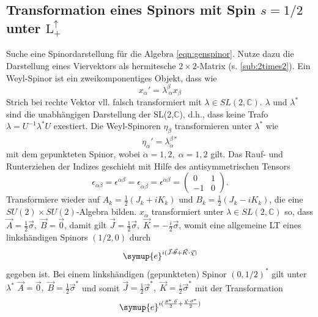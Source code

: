 \documentclass[
  captions=tableheading,  %
  titlepage=firstiscover, %
]{scrartcl}
\begin{document}
\subsection{Transformation eines Spinors mit Spin \texorpdfstring{$s = 1/2$}{PDFstring}
unter \texorpdfstring{$\text{L}_+^{\uparrow}$}{PDFstring}}
Suche eine Spinordarstellung für die Algebra \eqref{eqn:genspinor}.
Nutze dazu die Darstellung eines Viervektors als hermitesche $2\times 2$-Matrix (s. \ref{sub:2times2}).
Ein Weyl-Spinor ist ein zweikomponentiges Objekt, dass wie 
\begin{equation*}
  x_{\alpha}' = \lambda_{\; \alpha}^{\beta} x_{\beta}
\end{equation*}
{\color{red} Strich bei rechte Vektor vll. falsch}
transformiert mit $\lambda \in SL(2, \mathbb{C})$.
$\lambda$ und $\lambda^*$ sind die unabhängigen Darstellung der SL(2,$\mathbb{C}$), d.h., dass 
keine Trafo $\lambda = U^{-1} \lambda^* U$ exestiert.
Die Weyl-Spinoren $\eta_{\dot{\beta}}$ transformieren unter $\lambda^*$ wie 
\begin{equation*}
  \eta_{\dot{\alpha}}' =  \lambda_{\dot{\alpha}}^{\dot{\beta}*} 
\end{equation*}
mit dem gepunkteten Spinor, wobei $\dot{\alpha} = 1,2, \; \alpha  = 1,2$ gilt.
Das Rauf- und Runterziehen der Indizes geschieht mit Hilfe des antisymmetrischen Tensors  
\begin{equation*}
  \epsilon_{\alpha \beta} = \epsilon^{\alpha \beta} = \epsilon_{\dot{\alpha} \dot{\beta}} =
  \epsilon^{\dot{\alpha} \dot{\beta}}  = 
  \begin{pmatrix}
    0 & 1 \\
    -1 & 0
  \end{pmatrix} .
\end{equation*}
Transformiere wieder auf $A_k = \frac{1}{2} (J_k + i K_k)$ und $B_k = \frac{1}{2} (J_k - i K_k)$, die eine 
$SU(2) \times SU(2)$-Algebra bilden.
$x_{\alpha}$ transformiert unter $\lambda \in SL(2, \mathbb{C})$ so, dass 
$\vec{A} = \frac{1}{2}\vec{\sigma}, \; \vec{B} = \vec{0}$, damit gilt 
$\vec{J} =\frac{1}{2}\vec{\sigma}, \; \vec{K} = -\frac{i}{2}\vec{\sigma}$, womit eine 
allgemeine LT eines linkshändigen Spinors $(1/2, 0)$ durch 
\begin{equation*}
  \symup{e}^{i(\vec{J}\cdot \vec{\theta} + \vec{K} \cdot \vec{\chi})}
\end{equation*}
gegeben ist.
Bei einem linkshändigen (gepunkteten) Spinor $(0, 1/2)^*$ gilt unter $\lambda^*$ 
$\vec{A} = \vec{0}, \; \vec{B} = \frac{1}{2}\vec{\sigma}^*$ und somit 
$\vec{J} =\frac{1}{2}\vec{\sigma}^*, \; \vec{K} = \frac{i}{2}\vec{\sigma}^*$ 
mit der Transformation 
\begin{equation*}
  \symup{e}^{i(\frac{\vec{\sigma}^* \cdot \vec{\theta}}{2} + \frac{\vec{\chi} \cdot \vec{\sigma}^*}{2})}
\end{equation*}
\end{document}
